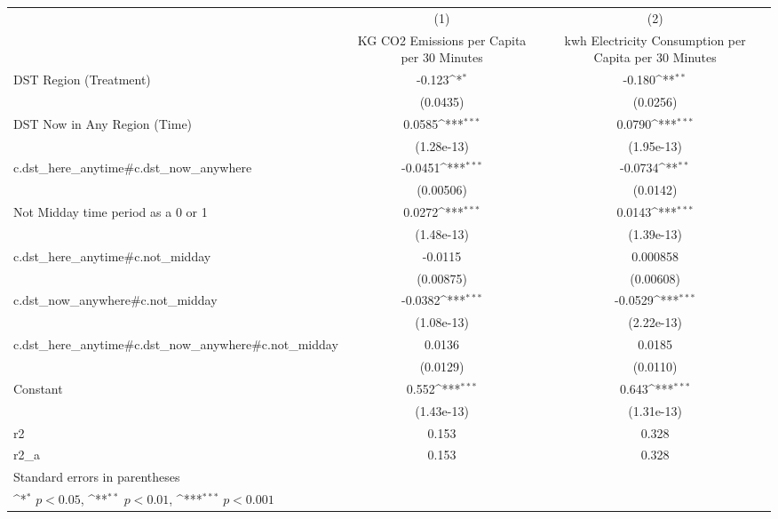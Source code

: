 {
\def\sym#1{\ifmmode^{#1}\else\(^{#1}\)\fi}
\begin{tabular}{l*{2}{c}}
\hline\hline
                    &\multicolumn{1}{c}{(1)}&\multicolumn{1}{c}{(2)}\\
                    &\multicolumn{1}{c}{KG CO2 Emissions per Capita per 30 Minutes}&\multicolumn{1}{c}{kwh Electricity Consumption per Capita per 30 Minutes}\\
\hline
DST Region (Treatment)&      -0.123\sym{*}  &      -0.180\sym{**} \\
                    &    (0.0435)         &    (0.0256)         \\
[1em]
DST Now in Any Region (Time)&      0.0585\sym{***}&      0.0790\sym{***}\\
                    &  (1.28e-13)         &  (1.95e-13)         \\
[1em]
c.dst\_here\_anytime#c.dst\_now\_anywhere&     -0.0451\sym{***}&     -0.0734\sym{**} \\
                    &   (0.00506)         &    (0.0142)         \\
[1em]
Not Midday time period as a 0 or 1&      0.0272\sym{***}&      0.0143\sym{***}\\
                    &  (1.48e-13)         &  (1.39e-13)         \\
[1em]
c.dst\_here\_anytime#c.not\_midday&     -0.0115         &    0.000858         \\
                    &   (0.00875)         &   (0.00608)         \\
[1em]
c.dst\_now\_anywhere#c.not\_midday&     -0.0382\sym{***}&     -0.0529\sym{***}\\
                    &  (1.08e-13)         &  (2.22e-13)         \\
[1em]
c.dst\_here\_anytime#c.dst\_now\_anywhere#c.not\_midday&      0.0136         &      0.0185         \\
                    &    (0.0129)         &    (0.0110)         \\
[1em]
Constant            &       0.552\sym{***}&       0.643\sym{***}\\
                    &  (1.43e-13)         &  (1.31e-13)         \\
\hline
r2                  &       0.153         &       0.328         \\
r2\_a                &       0.153         &       0.328         \\
\hline\hline
\multicolumn{3}{l}{\footnotesize Standard errors in parentheses}\\
\multicolumn{3}{l}{\footnotesize \sym{*} \(p<0.05\), \sym{**} \(p<0.01\), \sym{***} \(p<0.001\)}\\
\end{tabular}
}

